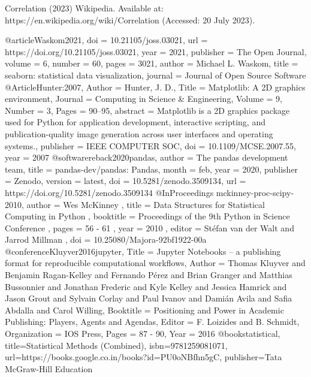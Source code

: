 \documentclass[conference]{IEEEtran}
\begin{document}
\begin{thebibliography}{00}
Correlation (2023) Wikipedia. Available at: https://en.wikipedia.org/wiki/Correlation (Accessed: 20 July 2023). 

@article{Waskom2021,
    doi = {10.21105/joss.03021},
    url = {https://doi.org/10.21105/joss.03021},
    year = {2021},
    publisher = {The Open Journal},
    volume = {6},
    number = {60},
    pages = {3021},
    author = {Michael L. Waskom},
    title = {seaborn: statistical data visualization},
    journal = {Journal of Open Source Software}
 }
 @Article{Hunter:2007,
  Author    = {Hunter, J. D.},
  Title     = {Matplotlib: A 2D graphics environment},
  Journal   = {Computing in Science \& Engineering},
  Volume    = {9},
  Number    = {3},
  Pages     = {90--95},
  abstract  = {Matplotlib is a 2D graphics package used for Python for
  application development, interactive scripting, and publication-quality
  image generation across user interfaces and operating systems.},
  publisher = {IEEE COMPUTER SOC},
  doi       = {10.1109/MCSE.2007.55},
  year      = 2007
}
@software{reback2020pandas,
    author       = {The pandas development team},
    title        = {pandas-dev/pandas: Pandas},
    month        = feb,
    year         = 2020,
    publisher    = {Zenodo},
    version      = {latest},
    doi          = {10.5281/zenodo.3509134},
    url          = {https://doi.org/10.5281/zenodo.3509134}
}
@InProceedings{ mckinney-proc-scipy-2010,
  author    = { {W}es {M}c{K}inney },
  title     = { {D}ata {S}tructures for {S}tatistical {C}omputing in {P}ython },
  booktitle = { {P}roceedings of the 9th {P}ython in {S}cience {C}onference },
  pages     = { 56 - 61 },
  year      = { 2010 },
  editor    = { {S}t\'efan van der {W}alt and {J}arrod {M}illman },
  doi       = { 10.25080/Majora-92bf1922-00a }
}
@conference{Kluyver2016jupyter,
Title = {Jupyter Notebooks -- a publishing format for reproducible computational workflows},
Author = {Thomas Kluyver and Benjamin Ragan-Kelley and Fernando P{\'e}rez and Brian Granger and Matthias Bussonnier and Jonathan Frederic and Kyle Kelley and Jessica Hamrick and Jason Grout and Sylvain Corlay and Paul Ivanov and Dami{\'a}n Avila and Safia Abdalla and Carol Willing},
Booktitle = {Positioning and Power in Academic Publishing: Players, Agents and Agendas},
Editor = {F. Loizides and B. Schmidt},
Organization = {IOS Press},
Pages = {87 - 90},
Year = {2016}
} 
@book{statistical,
  title={Statistical Methods (Combined)},
  isbn={9781259081071},
  url={https://books.google.co.in/books?id=PU0oNBfhn5gC},
  publisher={Tata McGraw-Hill Education}
}
\end{thebibliography}
\end{document}
